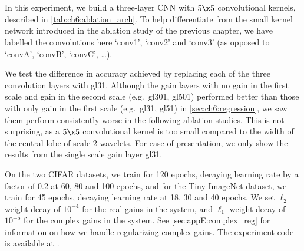 \begin{figure}
  \centering
  \\
  \\
  \label{fig:ch6:gl_results}
\end{figure}

In this experiment, we build a three-layer CNN with $5\x 5$ convolutional
kernels, described in \autoref{tab:ch6:ablation_arch}.  To help differentiate
from the small kernel network introduced in the ablation study of the previous
chapter, we have labelled the convolutions here `conv1', `conv2' and `conv3' (as
opposed to `convA', `convB', `convC', \ldots).

We test the difference in accuracy achieved by replacing each of the three
convolution layers with gl31.
Although the gain layers with no gain in the first scale and gain in the second
scale (e.g.\ gl301, gl501) performed better than those with only gain in the first scale 
(e.g.\ gl31, gl51) in \autoref{sec:ch6:regression}, we saw them perform consistently worse in the
following ablation studies. This is not surprising, as a $5\x 5$ convolutional
kernel is too small compared to the width of the central lobe of scale 2
wavelets. For ease of presentation, we only show the results from the single
scale gain layer gl31.

On the two CIFAR datasets, we train for 120 epochs, decaying learning rate by a
factor of 0.2 at 60, 80 and 100 epochs, and for the Tiny ImageNet dataset, we
train for 45 epochs, decaying learning rate at 18, 30 and 40 epochs. We set
$\ell_2$ weight decay of $10^{-4}$ for the real gains in the system,
and $\ell_1$ weight decay of $10^{-5}$ for the complex gains in the system.
See
\autoref{sec:appE:complex_reg} for information on how we handle regularizing complex
gains. The experiment code is available at \cite{cotter_dtcwt_2018}.

